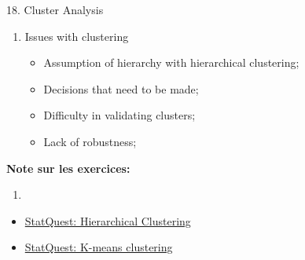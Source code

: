 \documentclass[12pt, titlepage, french]{report}
\begin{document}
\begin{CHPT_SUMM}{18. Cluster Analysis}
\begin{enumerate}
\begin{itemize}
\begin{enumerate}
			\item	Centroid linkage
		\end{enumerate}
	\end{itemize}
	\item	Issues with clustering
	\begin{itemize}
		\item	Assumption of hierarchy with hierarchical clustering;
		\item	Decisions that need to be made;
		\item	Difficulty in validating clusters;
		\item	Lack of robustness;
	\end{itemize}
\end{enumerate}
\textbf{Note sur les exercices:} 
\begin{enumerate}
	\item	
\end{enumerate}
\end{CHPT_SUMM}

\begin{YTB_vids}
\begin{itemize}
	\item	\href{https://www.youtube.com/watch?v=7xHsRkOdVwo&list=PLblh5JKOoLUICTaGLRoHQDuF_7q2GfuJF&index=31}{StatQuest: Hierarchical Clustering}
	\item	\href{https://www.youtube.com/watch?v=4b5d3muPQmA&list=PLblh5JKOoLUICTaGLRoHQDuF_7q2GfuJF&index=32}{StatQuest: K-means clustering}
\end{itemize}
\end{YTB_vids}
\end{document}
